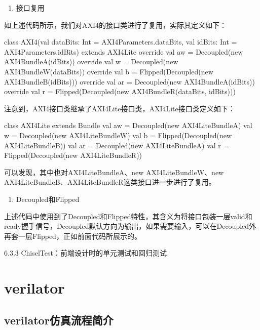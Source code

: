\begin{enumerate}
\def\labelenumi{\arabic{enumi}.}
\setcounter{enumi}{2}
\tightlist
\item
  接口复用
\end{enumerate}

如上述代码所示，我们对AXI4的接口类进行了复用，实际其定义如下：

\begin{CodeBlock}[language=BookScala]
class AXI4(val dataBits: Int = AXI4Parameters.dataBits, val idBits: Int = AXI4Parameters.idBits) extends AXI4Lite {
  override val aw = Decoupled(new AXI4BundleA(idBits))
  override val w  = Decoupled(new AXI4BundleW(dataBits))
  override val b  = Flipped(Decoupled(new AXI4BundleB(idBits)))
  override val ar = Decoupled(new AXI4BundleA(idBits))
  override val r  = Flipped(Decoupled(new AXI4BundleR(dataBits, idBits)))
}
\end{CodeBlock}

注意到，AXI4接口类继承了AXI4Lite接口类，AXI4Lite接口类定义如下：

\begin{CodeBlock}[language=BookScala]
class AXI4Lite extends Bundle {
  val aw = Decoupled(new AXI4LiteBundleA)
  val w  = Decoupled(new AXI4LiteBundleW)
  val b  = Flipped(Decoupled(new AXI4LiteBundleB))
  val ar = Decoupled(new AXI4LiteBundleA)
  val r  = Flipped(Decoupled(new AXI4LiteBundleR))
}
\end{CodeBlock}

可以发现，其中也对AXI4LiteBundleA、new AXI4LiteBundleW、new AXI4LiteBundleB、AXI4LiteBundleR这类接口进一步进行了复用。

\begin{enumerate}
\def\labelenumi{\arabic{enumi}.}
\setcounter{enumi}{3}
\tightlist
\item
  Decoupled和Flipped
\end{enumerate}

上述代码中使用到了Decoupled和Flipped特性，其含义为将接口包装一层valid和ready握手信号，Decoupled默认方向为输出，如果需要输入，可以在Decoupled外再套一层Flipped，正如前面代码所展示的。

6.3.3 ChiselTest：前端设计时的单元测试和回归测试

\section{verilator}\label{sec:06-agility-011}

\subsection{verilator仿真流程简介}\label{sec:06-agility-012}

